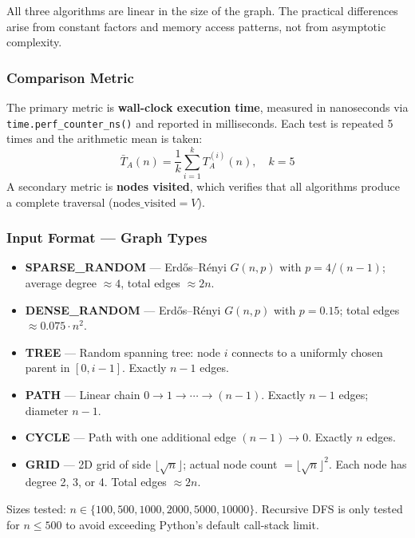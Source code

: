 All three algorithms are linear in the size of the graph. The practical differences arise from constant factors and memory access patterns, not from asymptotic complexity.

\subsubsection{Comparison Metric}
The primary metric is \textbf{wall-clock execution time}, measured in nanoseconds via \texttt{time.perf\_counter\_ns()} and reported in milliseconds. Each test is repeated 5 times and the arithmetic mean is taken:
\[
    \bar{T}_A(n) = \frac{1}{k} \sum_{i=1}^{k} T_A^{(i)}(n), \quad k = 5
\]
A secondary metric is \textbf{nodes visited}, which verifies that all algorithms produce a complete traversal ($\text{nodes\_visited} = V$).

\subsubsection{Input Format — Graph Types}
\begin{itemize}
    \item \textbf{SPARSE\_RANDOM} — Erdős–Rényi $G(n, p)$ with $p = 4/(n-1)$; average degree $\approx 4$, total edges $\approx 2n$.
    \item \textbf{DENSE\_RANDOM} — Erdős–Rényi $G(n, p)$ with $p = 0.15$; total edges $\approx 0.075 \cdot n^2$.
    \item \textbf{TREE} — Random spanning tree: node $i$ connects to a uniformly chosen parent in $[0, i-1]$. Exactly $n-1$ edges.
    \item \textbf{PATH} — Linear chain $0 \to 1 \to \cdots \to (n-1)$. Exactly $n-1$ edges; diameter $n-1$.
    \item \textbf{CYCLE} — Path with one additional edge $(n-1) \to 0$. Exactly $n$ edges.
    \item \textbf{GRID} — 2D grid of side $\lfloor\sqrt{n}\rfloor$; actual node count $= \lfloor\sqrt{n}\rfloor^2$. Each node has degree 2, 3, or 4. Total edges $\approx 2n$.
\end{itemize}

Sizes tested: $n \in \{100, 500, 1000, 2000, 5000, 10000\}$. Recursive DFS is only tested for $n \leq 500$ to avoid exceeding Python's default call-stack limit.



